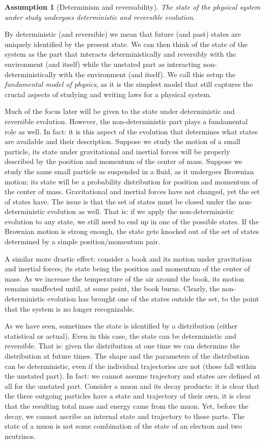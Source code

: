 \documentclass[aps,pra,10pt,twocolumn,floatfix,nofootinbib]{revtex4-1}
\newtheorem{assump}{Assumption}
\theoremstyle{definition}
\begin{document}
\begin{assump}[Determinism and reversability]
The state of the physical system under study undergoes deterministic and reversible evolution.
\end{assump}

By deterministic (and reversible) we mean that future (and past) states are uniquely identified by the present state. We can then think of the state of the system as the part that interacts deterministically and reversibly with the environment (and itself) while the unstated part as interacting non-deterministically with the environment (and itself). We call this setup the \emph{fundamental model of physics}, as it is the simplest model that still captures the crucial aspects of studying and writing laws for a physical system.

Much of the focus later will be given to the state under deterministic and reversible evolution. However, the non-deterministic part plays a fundamental role as well. In fact: it is this aspect of the evolution that determines what states are available and their description. Suppose we study the motion of a small particle, its state under gravitational and inertial forces will be properly described by the position and momentum of the center of mass. Suppose we study the same small particle as suspended in a fluid, as it undergoes Brownian motion: its state will be a probability distribution for position and momentum of the center of mass. Gravitational and inertial forces have not changed, yet the set of states have. The issue is that the set of states must be closed under the non-deterministic evolution as well. That is: if we apply the non-deterministic evolution to any state, we still need to end up in one of the possible states. If the Brownian motion is strong enough, the state gets knocked out of the set of states determined by a simple position/momentum pair.

A similar more drastic effect: consider a book and its motion under gravitation and inertial forces, its state being the position and momentum of the center of mass. As we increase the temperature of the air around the book, its motion remains unaffected until, at some point, the book burns. Clearly, the non-deterministic evolution has brought one of the states outside the set, to the point that the system is no longer recognizable.

As we have seen, sometimes the state is identified by a distribution (either statistical or actual). Even in this case, the state can be deterministic and reversible. That is: given the distribution at one time we can determine the distribution at future times. The shape and the parameters of the distribution can be deterministic, even if the individual trajectories are not (those fall within the unstated part). In fact: we cannot assume trajectory and states are defined at all for the unstated part. Consider a muon and its decay products: it is clear that the three outgoing particles have a state and trajectory of their own, it is clear that the resulting total mass and energy came from the muon. Yet, before the decay, we cannot ascribe an internal state and trajectory to those parts. The state of a muon is not some combination of the state of an electron and two neutrinos.
\end{document}

